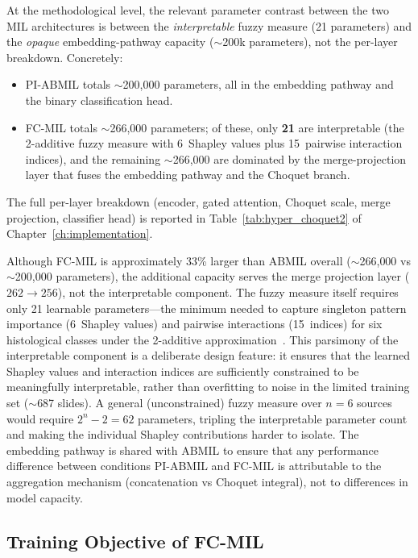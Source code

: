 At the methodological level, the relevant parameter contrast between
the two MIL architectures is between the \emph{interpretable} fuzzy
measure (21 parameters) and the \emph{opaque} embedding-pathway
capacity ($\sim$200k parameters), not the per-layer breakdown.
Concretely:
\begin{itemize}
    \item PI-ABMIL totals $\sim$200{,}000 parameters, all in the
    embedding pathway and the binary classification head.
    \item FC-MIL totals $\sim$266{,}000 parameters; of these, only
    \textbf{21} are interpretable (the 2-additive fuzzy measure with
    6~Shapley values plus 15~pairwise interaction indices), and the
    remaining $\sim$266{,}000 are dominated by the merge-projection
    layer that fuses the embedding pathway and the Choquet branch.
\end{itemize}
The full per-layer breakdown (encoder, gated attention, Choquet
scale, merge projection, classifier head) is reported in
Table~\ref{tab:hyper_choquet2} of
Chapter~\ref{ch:implementation}.

Although FC-MIL is approximately 33\% larger than ABMIL overall
($\sim$266{,}000 vs $\sim$200{,}000 parameters), the additional
capacity serves the merge projection layer ($262 \to 256$), not
the interpretable component.
The fuzzy measure itself requires only 21 learnable
parameters---the minimum needed to capture singleton pattern
importance (6~Shapley values) and pairwise interactions
(15~indices) for six histological classes under the 2-additive
approximation~\cite{grabisch1997kapprox}.
This parsimony of the interpretable component is a deliberate
design feature: it ensures that the learned Shapley values and
interaction indices are sufficiently constrained to be meaningfully
interpretable, rather than overfitting to noise in the limited
training set ($\sim$687 slides).
A general (unconstrained) fuzzy measure over $n = 6$ sources would
require $2^n - 2 = 62$ parameters, tripling the interpretable
parameter count and making the individual Shapley contributions
harder to isolate.
The embedding pathway is shared with ABMIL to ensure that any
performance difference between conditions PI-ABMIL and FC-MIL is attributable to
the aggregation mechanism (concatenation vs Choquet integral), not to
differences in model capacity.

\subsection{Training Objective of FC-MIL}
\label{sec:meth:choquet:training}

